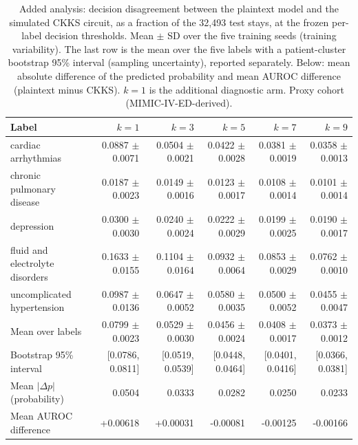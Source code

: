 \begin{table}[t]
\centering
\caption{Added analysis: decision disagreement between the plaintext model and the simulated CKKS circuit, as a fraction of the 32,493 test stays, at the frozen per-label decision thresholds. Mean $\pm$ SD over the five training seeds (training variability). The last row is the mean over the five labels with a patient-cluster bootstrap 95\% interval (sampling uncertainty), reported separately. Below: mean absolute difference of the predicted probability and mean AUROC difference (plaintext minus CKKS). $k=1$ is the additional diagnostic arm. Proxy cohort (MIMIC-IV-ED-derived).}
\label{tab:s4_decision_agreement}
\begin{tabular}{lrrrrr}
\toprule
Label & $k=1$ & $k=3$ & $k=5$ & $k=7$ & $k=9$ \\
\midrule
cardiac arrhythmias & 0.0887 $\pm$ 0.0071 & 0.0504 $\pm$ 0.0021 & 0.0422 $\pm$ 0.0028 & 0.0381 $\pm$ 0.0019 & 0.0358 $\pm$ 0.0013 \\
chronic pulmonary disease & 0.0187 $\pm$ 0.0023 & 0.0149 $\pm$ 0.0016 & 0.0123 $\pm$ 0.0017 & 0.0108 $\pm$ 0.0014 & 0.0101 $\pm$ 0.0014 \\
depression & 0.0300 $\pm$ 0.0030 & 0.0240 $\pm$ 0.0024 & 0.0222 $\pm$ 0.0029 & 0.0199 $\pm$ 0.0025 & 0.0190 $\pm$ 0.0017 \\
fluid and electrolyte disorders & 0.1633 $\pm$ 0.0155 & 0.1104 $\pm$ 0.0164 & 0.0932 $\pm$ 0.0064 & 0.0853 $\pm$ 0.0029 & 0.0762 $\pm$ 0.0010 \\
uncomplicated hypertension & 0.0987 $\pm$ 0.0136 & 0.0647 $\pm$ 0.0052 & 0.0580 $\pm$ 0.0035 & 0.0500 $\pm$ 0.0052 & 0.0455 $\pm$ 0.0047 \\
\midrule
Mean over labels & 0.0799 $\pm$ 0.0023 & 0.0529 $\pm$ 0.0030 & 0.0456 $\pm$ 0.0024 & 0.0408 $\pm$ 0.0017 & 0.0373 $\pm$ 0.0012 \\
Bootstrap 95\% interval & [0.0786, 0.0811] & [0.0519, 0.0539] & [0.0448, 0.0464] & [0.0401, 0.0416] & [0.0366, 0.0381] \\
\midrule
Mean $|\Delta p|$ (probability) & 0.0504 & 0.0333 & 0.0282 & 0.0250 & 0.0233 \\
Mean AUROC difference & +0.00618 & +0.00031 & -0.00081 & -0.00125 & -0.00166 \\
\bottomrule
\end{tabular}
\end{table}
